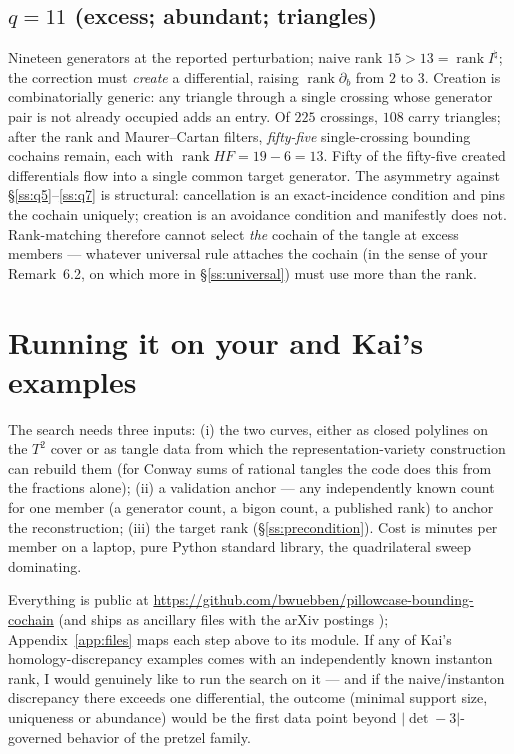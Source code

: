 \documentclass[11pt,reqno]{amsart}
\theoremstyle{plain}
\theoremstyle{definition}
\newcommand{\Inat}{I^{\natural}}
\newcommand{\HF}{\mathit{HF}}
\newcommand{\rk}{\operatorname{rank}}
\newcommand{\bc}{b}
\begin{document}
\subsection{$q=11$ (excess; abundant; triangles)}\label{ss:q11}
Nineteen generators at the reported perturbation; naive rank $15>13=\rk\Inat$; the correction
must \emph{create} a differential, raising $\rk\partial_\bc$ from $2$ to $3$. Creation is
combinatorially generic: any triangle through a single crossing whose generator pair is not
already occupied adds an entry. Of $225$ crossings, $108$ carry triangles; after the rank and
Maurer--Cartan filters, \emph{fifty-five} single-crossing bounding cochains remain, each with
$\rk\HF=19-6=13$. Fifty of the fifty-five created differentials flow into a single common
target generator. The asymmetry against \S\ref{ss:q5}--\ref{ss:q7} is structural:
cancellation is an exact-incidence condition and pins the cochain uniquely; creation is an
avoidance condition and manifestly does not. Rank-matching therefore cannot select \emph{the}
cochain of the tangle at excess members --- whatever universal rule attaches the cochain (in
the sense of your Remark~6.2, on which more in \S\ref{ss:universal}) must use more than the
rank.

\section{Running it on your and Kai's examples}\label{sec:yours}

The search needs three inputs: (i) the two curves, either as closed polylines on the $T^2$
cover or as tangle data from which the representation-variety construction can rebuild them
(for Conway sums of rational tangles the code does this from the fractions alone); (ii) a
validation anchor --- any independently known count for one member (a generator count, a bigon
count, a published rank) to anchor the reconstruction; (iii) the target rank
(\S\ref{ss:precondition}). Cost is minutes per member on a laptop, pure Python standard
library, the quadrilateral sweep dominating.

Everything is public at
\url{https://github.com/bwuebben/pillowcase-bounding-cochain}
(and ships as ancillary files with the arXiv postings \cite{P1,P2}); Appendix~\ref{app:files} maps each
step above to its module. If any of Kai's homology-discrepancy examples comes with an
independently known instanton rank, I would genuinely like to run the search on it --- and if
the naive/instanton discrepancy there exceeds one differential, the outcome (minimal support
size, uniqueness or abundance) would be the first data point beyond $|{\det}-3|$-governed
behavior of the pretzel family.
\end{document}
